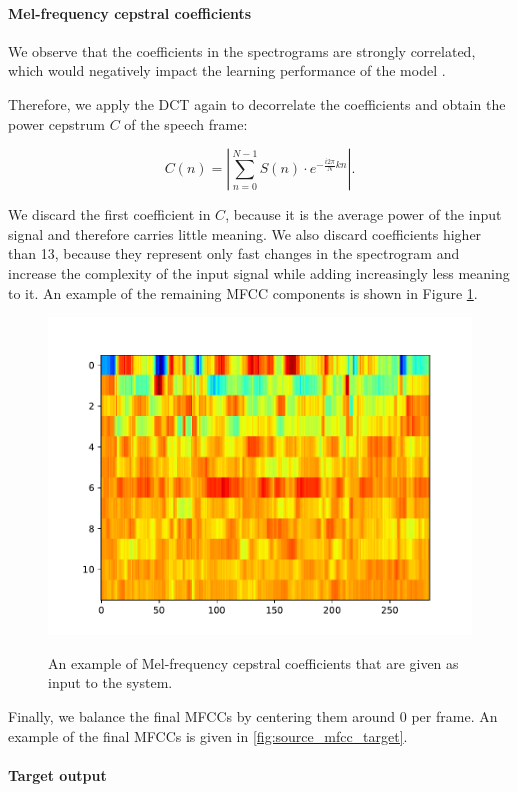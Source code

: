 		\paragraph{Mel-frequency cepstral coefficients}

			We observe that the coefficients in the spectrograms are strongly correlated, which would negatively impact the learning performance of the model .

			Therefore, we apply the DCT again to decorrelate the coefficients and obtain the power cepstrum $C$ of the speech frame:

			\begin{equation}\label{eq:magframes}
				C(n) = \left|\sum_{n=0}^{N-1}S(n)\cdot e^{-\frac{i2\pi}{N}kn}\right|.
			\end{equation}

			We discard the first coefficient in $C$, because it is the average power of the input signal and therefore carries little meaning.
			We also discard coefficients higher than 13, because they represent only fast changes in the spectrogram and increase the complexity of the input signal while adding increasingly less meaning to it. 
			An example of the remaining MFCC components is shown in Figure \ref{fig:mfccs}.

			\begin{figure}[ht]
				\centering
			    \includegraphics[width=.45\linewidth]{gfx/mfcc}
			    \label{fig:mfccs}
			    \caption{An example of Mel-frequency cepstral coefficients that are given as input to the system.}
			\end{figure}

			Finally, we balance the final MFCCs by centering them around 0 per frame.
			An example of the final MFCCs is given in \ref{fig:source_mfcc_target}.

		\paragraph{Target output}

